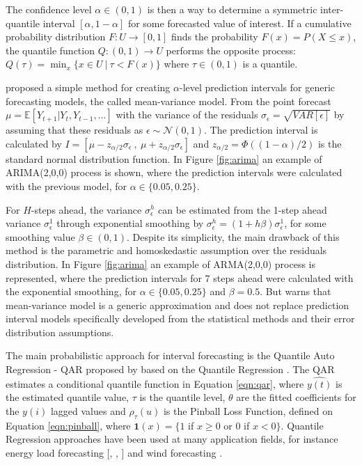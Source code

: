 The confidence level $\alpha \in (0,1)$ is then a way to determine a symmetric inter-quantile interval $[\alpha, 1-\alpha]$ for some forecasted value of interest. If a cumulative probability distribution $F:U \rightarrow [0,1]$ finds the probability $F(x) =  P(X \leq x)$, the quantile function $Q:(0,1) \rightarrow U$ performs the opposite process: $Q(\tau) = \min_x\{ x \in U \ |\ \tau < F(x) \}$ where $\tau \in (0,1)$ is a quantile.


\cite{Chatfield2001} proposed a simple method for creating $\alpha$-level prediction intervals for generic forecasting models, the called mean-variance model. From the point forecast $\mu = \mathbb{E}[Y_{t+1}|Y_t,Y_{t-1},...]$ with the variance of the residuals $\sigma_\epsilon = \sqrt{VAR[\epsilon]}$ by assuming that these residuals as $\epsilon \sim \mathcal{N}(0,1)$. The prediction interval is calculated by $I = [\mu - z_{\alpha/2}\sigma_\epsilon\ ,\ \mu + z_{\alpha/2}\sigma_\epsilon]$ and $z_{\alpha/2} = \Phi((1- \alpha)/2)$ is the standard normal distribution function. In Figure \ref{fig:arima} an example of ARIMA(2,0,0) process is shown, where the prediction intervals were calculated with the previous model, for $\alpha \in \{0.05,0.25\}$. 

For $H$-steps ahead, the variance $\sigma_\epsilon^h$ can be estimated from the 1-step ahead variance $\sigma_\epsilon^1$ through exponential smoothing by $\sigma_\epsilon^h = (1 + h\beta)\sigma_\epsilon^1$, for some smoothing value $\beta \in (0,1)$. Despite its simplicity, the main drawback of this method is the parametric and homoskedastic assumption over the residuals distribution. In Figure \ref{fig:arima} an example of ARMA(2,0,0) process is represented, where the prediction intervals for 7 steps ahead were calculated with the exponential smoothing, for $\alpha \in \{0.05,0.25\}$ and $\beta = 0.5$. But \cite{Chatfield2001} warns that mean-variance model is a generic approximation and does not replace prediction interval models specifically developed from the statistical methods and their error distribution assumptions. 


The main probabilistic approach for interval forecasting is the Quantile Auto Regression - QAR proposed by \cite{Koenker2006} based on the Quantile Regression \cite{Koenker2001}. The QAR estimates a conditional quantile function in Equation \eqref{eqn:qar}, where $\hat{y(t)}$ is the estimated quantile value, $\tau$ is the quantile level, $\theta$ are the fitted coefficients for the $y(i)$ lagged values and $\rho_\tau(u)$ is the Pinball Loss Function, defined on Equation \eqref{eqn:pinball}, where $\mathbf{1}(x) = \{ 1$ if $x \geq 0$ or $0$ if $x < 0\}$. Quantile Regression approaches have been used at many application fields, for instance energy load forecasting [\cite{Liu2015}, \cite{Hong2016}, \cite{Hong2016a}] and wind forecasting \cite{Pinson2006}.

